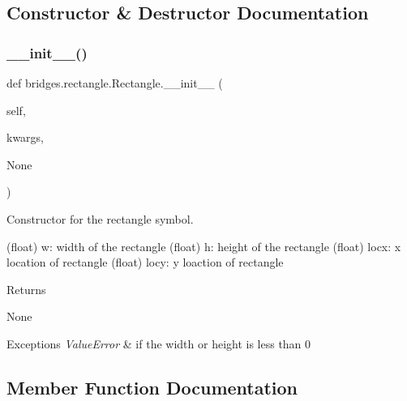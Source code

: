 \subsection{Constructor \& Destructor Documentation}
\mbox{\label{classbridges_1_1rectangle_1_1_rectangle_aad5cb2fdd1da2686fb67de2150f55d42}} 
\subsubsection{\texorpdfstring{\+\_\+\+\_\+init\+\_\+\+\_\+()}{\_\_init\_\_()}}
{\footnotesize\ttfamily def bridges.\+rectangle.\+Rectangle.\+\_\+\+\_\+init\+\_\+\+\_\+ (\begin{DoxyParamCaption}\item[{}]{self,  }\item[{}]{kwargs,  }\item[{}]{None }\end{DoxyParamCaption})}



Constructor for the rectangle symbol. 

(float) w\+: width of the rectangle (float) h\+: height of the rectangle (float) locx\+: x location of rectangle (float) locy\+: y loaction of rectangle \begin{DoxyReturn}{Returns}


None
\end{DoxyReturn}

\begin{DoxyExceptions}{Exceptions}
{\em Value\+Error} & if the width or height is less than 0 \\
\hline
\end{DoxyExceptions}


\subsection{Member Function Documentation}
\mbox{\label{classbridges_1_1rectangle_1_1_rectangle_a3f3823c7058ee639a92494276c2c9f22}} 
